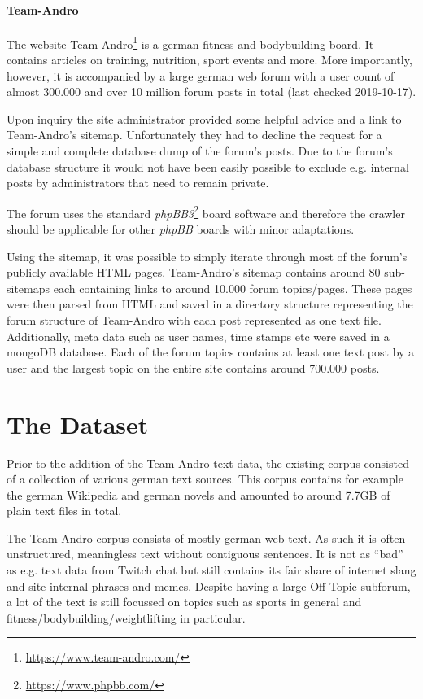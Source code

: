 \documentclass{scrartcl}
\begin{document}
\paragraph{Team-Andro} The website Team-Andro\footnote{\url{https://www.team-andro.com/}} is a german fitness and bodybuilding board. It contains articles on training, nutrition, sport events and more. More importantly, however, it is accompanied by a large german web forum with a user count of almost 300.000 and over 10 million forum posts in total (last checked 2019-10-17).

Upon inquiry the site administrator provided some helpful advice and a link to Team-Andro's sitemap. Unfortunately they had to decline the request for a simple and complete database dump of the forum's posts. Due to the forum's database structure it would not have been easily possible to exclude e.g. internal posts by administrators that need to remain private.

The forum uses the standard \textit{phpBB3}\footnote{\url{https://www.phpbb.com/}} board software and therefore the crawler should be applicable for other \textit{phpBB} boards with minor adaptations.


Using the sitemap, it was possible to simply iterate through most of the forum's publicly available HTML pages. Team-Andro's sitemap contains around 80 sub-sitemaps each containing links to around 10.000 forum topics/pages. These pages were then parsed from HTML and saved in a directory structure representing the forum structure of Team-Andro with each post represented as one text file. Additionally, meta data such as user names, time stamps etc were saved in a mongoDB database.
Each of the forum topics contains at least one text post by a user and the largest topic on the entire site contains around 700.000 posts.


\section{The Dataset}

Prior to the addition of the Team-Andro text data, the existing corpus consisted of a collection of various german text sources. This corpus contains for example the german Wikipedia and german novels and amounted to around 7.7GB of plain text files in total.


The Team-Andro corpus consists of mostly german web text. As such it is often unstructured, meaningless text without contiguous sentences. It is not as \enquote{bad} as e.g. text data from Twitch chat but still contains its fair share of internet slang and site-internal phrases and memes. Despite having a large Off-Topic subforum, a lot of the text is still focussed on topics such as sports in general and fitness/bodybuilding/weightlifting in particular.
\end{document}
